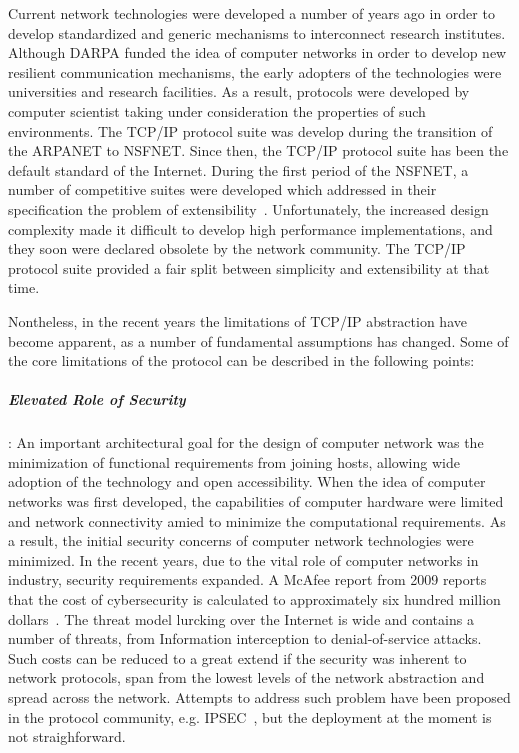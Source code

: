 Current network technologies were developed a number of years ago in order to
develop standardized and generic mechanisms to interconnect
research institutes. Although DARPA funded the idea of computer networks in
order to develop new resilient communication mechanisms, the early adopters of
the technologies were universities and research facilities. As a result,
protocols were developed by computer scientist taking under consideration the
properties of such environments. The TCP/IP protocol suite was develop during
the transition of the ARPANET to NSFNET. Since then, the TCP/IP protocol suite
has been the default standard of the Internet.  During the first period of the
NSFNET, a number of competitive suites were developed which addressed in their
specification the problem of extensibility~.  Unfortunately, the increased design complexity made it
difficult to develop high performance implementations, and they soon
were declared obsolete by the network community. The TCP/IP protocol suite provided a fair
split between simplicity and extensibility at that time.

Nontheless, in the recent years the limitations of TCP/IP abstraction have
become apparent, as a number of fundamental assumptions has changed. Some of the
core limitations of the protocol can be described in the following points:

\subparagraph*{Elevated Role of Security}: 
An important architectural goal for the design of computer network was the
minimization of functional requirements from joining hosts, allowing wide
adoption of the technology and open accessibility.  When the idea of computer
networks was first developed, the capabilities of computer hardware were limited
and network connectivity amied to minimize the computational requirements. 
As a result, the initial security
concerns of computer network technologies were minimized. In the recent
years, due to the vital role of computer networks in industry, security
requirements expanded. A McAfee report from 2009 reports that the cost of
cybersecurity is calculated to approximately six hundred million
dollars~\cite{kanan2009unsecured}. The threat model lurcking over the Internet is
wide and contains a number of threats, from Information interception to
denial-of-service attacks. Such costs can be reduced to a great extend if the security
was inherent to network protocols, span from the lowest levels of the
network abstraction and spread across the network. Attempts to address such
problem have been proposed in the protocol community, e.g. IPSEC~\cite{RFC2401},
but the deployment at the moment is not straighforward.

